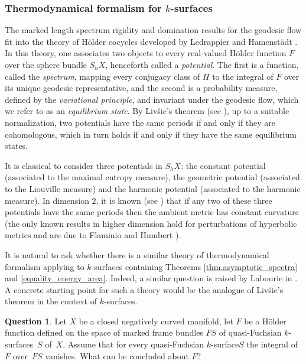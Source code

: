 \documentclass[11pt]{article}
\newcommand{\ksurface}{$k$\nobreakdash-surface\xspace}
\newcommand{\ksurfaces}{$k$\nobreakdash-surfaces\xspace}
\theoremstyle{plain}
\theoremstyle{definition}
\newtheorem{question}[theorem]{Question}
\begin{document}
\subsubsection{Thermodynamical formalism for \protect\ksurfaces}

The marked length spectrum rigidity and domination results for the geodesic flow fit into the theory of Hölder cocycles developed by Ledrappier and Hamenstädt \cite{HamenstadtMLS,Ledrappier_bord}. In this theory, one associates two objects to every real-valued Hölder function $F$ over the sphere bundle $S_hX$, henceforth called a \emph{potential}. The first is a function, called the \emph{spectrum}, mapping every conjugacy class of $\Pi$ to the integral of $F$ over its unique geodesic representative, and the second is a probability measure, defined by the \emph{variational principle}, and invariant under the geodesic flow, which we refer to as an \emph{equilibrium state}. By Liv\v{s}ic's theorem (see \cite{Guillemin_Kazhdan,Livsic}), up to a suitable normalization, two potentials have the same periods if and only if they are cohomologous, which in turn holds if and only if they have the same equilibrium states.

It is classical to consider three potentials in $S_hX$: the constant potential (associated to the maximal entropy measure), the geometric potential (associated to the Liouville measure) and the harmonic potential (associated to the harmonic measure). In dimension $2$, it is known (see \cite{Katok_entropy_closed,Katok4,Ledrappier_har_BM}) that if any two of these three potentials have the same periods then the ambient metric has constant curvature (the only known results in higher dimension hold for perturbations of hyperbolic metrics and are due to Flaminio \cite{Flaminio} and Humbert \cite{humbert2024katok}).

It is natural to ask whether there is a similar theory of thermodynamical formalism applying to \ksurfaces containing Theorems \ref{thm.asymptotic_spectra} and \ref{equality_energy_area}. Indeed, a similar question is raised by Labourie in \cite[Quest.\,8]{Labourie_phase_space}. A concrete starting point for such a theory would be the analogue of Liv\v{s}ic's theorem in the context of \ksurfaces.

\begin{question}
Let $X$ be a closed negatively curved manifold, let $F$ be a Hölder function defined on the space of marked frame bundles $FS$ of quasi-Fuchsian $k$\nobreakdash-sur\-faces~$S$ of~$X$. Assume that for every quasi-Fuchsian \ksurface $S$ the integral of $F$ over~$FS$ vanishes. What can be concluded about $F$?
\end{question}
\end{document}
